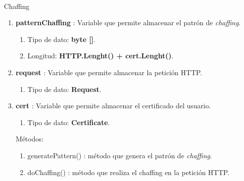 \documentclass[12pt, a4paper, titlepage]{report}
\begin{document}
			    \paragraph{}
	            Chaffing
			    \begin{enumerate}
    		        \item \textbf{patternChaffing} : Variable que permite almacenar el patrón de \textit{chaffing}.
    		        \begin{enumerate}
    		            \item Tipo de dato: \textbf{byte []}.
    		            \item Longitud: \textbf{HTTP.Lenght() + cert.Lenght()}.
    		        \end{enumerate}
    		        \item \textbf{request} : Variable que permite almacenar la petición HTTP.
    		        \begin{enumerate}
    		            \item Tipo de dato: \textbf{Request}.
    		        \end{enumerate}
    		        \item \textbf{cert} : Variable que permite almacenar el certificado del usuario.
    		        \begin{enumerate}
    		            \item Tipo de dato: \textbf{Certificate}.
    		        \end{enumerate}
    		        
    		        Métodos:
    		        \begin{enumerate}
    		            \item generatePattern() : método que genera el patrón de \textit{chaffing}.
    		            \item doChaffing() : método que realiza el chaffing en la petición HTTP.
    		        \end{enumerate}
			    \end{enumerate}
\end{document}
